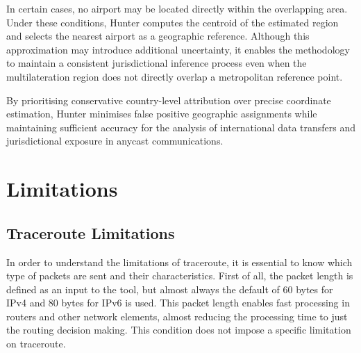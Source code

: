 In certain cases, no airport may be located directly within the overlapping area. Under these conditions, Hunter computes the centroid of the estimated region and selects the nearest airport as a geographic reference. Although this approximation may introduce additional uncertainty, it enables the methodology to maintain a consistent jurisdictional inference process even when the multilateration region does not directly overlap a metropolitan reference point.

By prioritising conservative country-level attribution over precise coordinate estimation, Hunter minimises false positive geographic assignments while maintaining sufficient accuracy for the analysis of international data transfers and jurisdictional exposure in anycast communications.

\section{Limitations}
\label{sc:hunter_limitations}

\subsection{Traceroute Limitations}
\label{sc:hunter_limitations_traceroute}

In order to understand the limitations of traceroute, it is essential to know which type of packets are sent and their characteristics. First of all, the packet length is defined as an input to the tool, but almost always the default of 60 bytes for IPv4 and 80 bytes for IPv6 is used. This packet length enables fast processing in routers and other network elements, almost reducing the processing time to just the routing decision making. This condition does not impose a specific limitation on traceroute.

